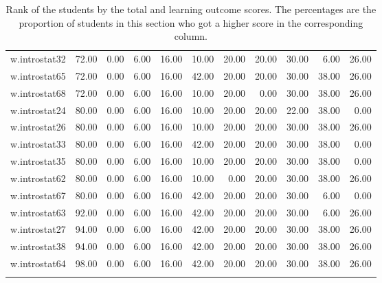 \documentclass[12pt,english,nohyper]{tufte-handout}\usepackage[]{graphicx}\usepackage[]{color}
\begin{document}
\begin{longtable}{rrrrrrrrrrr}
  w.introstat32 & 72.00 & 0.00 & 6.00 & 16.00 & 10.00 & 20.00 & 20.00 & 30.00 & 6.00 & 26.00 \\ 
  w.introstat65 & 72.00 & 0.00 & 6.00 & 16.00 & 42.00 & 20.00 & 20.00 & 30.00 & 38.00 & 26.00 \\ 
  w.introstat68 & 72.00 & 0.00 & 6.00 & 16.00 & 10.00 & 20.00 & 0.00 & 30.00 & 38.00 & 26.00 \\ 
  w.introstat24 & 80.00 & 0.00 & 6.00 & 16.00 & 10.00 & 20.00 & 20.00 & 22.00 & 38.00 & 0.00 \\ 
  w.introstat26 & 80.00 & 0.00 & 6.00 & 16.00 & 10.00 & 20.00 & 20.00 & 30.00 & 38.00 & 26.00 \\ 
  w.introstat33 & 80.00 & 0.00 & 6.00 & 16.00 & 42.00 & 20.00 & 20.00 & 30.00 & 38.00 & 0.00 \\ 
  w.introstat35 & 80.00 & 0.00 & 6.00 & 16.00 & 10.00 & 20.00 & 20.00 & 30.00 & 38.00 & 0.00 \\ 
  w.introstat62 & 80.00 & 0.00 & 6.00 & 16.00 & 10.00 & 0.00 & 20.00 & 30.00 & 38.00 & 26.00 \\ 
  w.introstat67 & 80.00 & 0.00 & 6.00 & 16.00 & 42.00 & 20.00 & 20.00 & 30.00 & 6.00 & 0.00 \\ 
  w.introstat63 & 92.00 & 0.00 & 6.00 & 16.00 & 42.00 & 20.00 & 20.00 & 30.00 & 6.00 & 26.00 \\ 
  w.introstat27 & 94.00 & 0.00 & 6.00 & 16.00 & 42.00 & 20.00 & 20.00 & 30.00 & 38.00 & 26.00 \\ 
  w.introstat38 & 94.00 & 0.00 & 6.00 & 16.00 & 42.00 & 20.00 & 20.00 & 30.00 & 38.00 & 26.00 \\ 
  w.introstat64 & 98.00 & 0.00 & 6.00 & 16.00 & 42.00 & 20.00 & 20.00 & 30.00 & 38.00 & 26.00 \\ 
   \hline
\hline
\caption{Rank of the students by the total and learning outcome scores. The percentages are the proportion of students in this section who got a higher score in the corresponding column.} 
\label{tab:LearningObj_rank}
\end{longtable}
\end{document}
